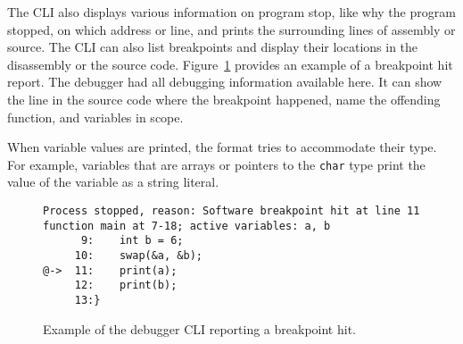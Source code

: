 The CLI also displays various information on program stop, like why the program
stopped, on which address or line, and prints the surrounding lines of assembly
or source. The CLI can also list breakpoints and display their locations in the
disassembly or the source code. Figure~\ref{fig:cli-hit} provides an example of
a breakpoint hit report. The debugger had all debugging information available
here. It can show the line in the source code where the breakpoint happened,
name the offending function, and variables in scope.

When variable values are printed, the format tries to accommodate their type.
For example, variables that are arrays or pointers to the \texttt{char} type
print the value of the variable as a string literal.

\begin{figure}
    \begin{lstlisting}
Process stopped, reason: Software breakpoint hit at line 11
function main at 7-18; active variables: a, b
      9:    int b = 6;
     10:    swap(&a, &b);
@->  11:    print(a);
     12:    print(b);
     13:}
    \end{lstlisting}
    \caption{Example of the debugger CLI reporting a breakpoint hit.}
    \label{fig:cli-hit}
\end{figure}
